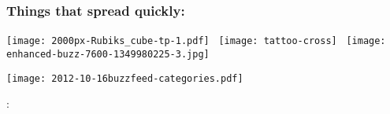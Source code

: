 \begin{frame}



  \frametitle{Things that spread quickly:}

    \texttt{[image: 2000px-Rubiks\_cube-tp-1.pdf]}
    \ \texttt{[image: tattoo-cross]}
    \ \texttt{[image: enhanced-buzz-7600-1349980225-3.jpg]}

    \bigskip

    \begin{center}
      \texttt{[image: 2012-10-16buzzfeed-categories.pdf]}
    \end{center}


    \vfill 

    :


\end{frame}





